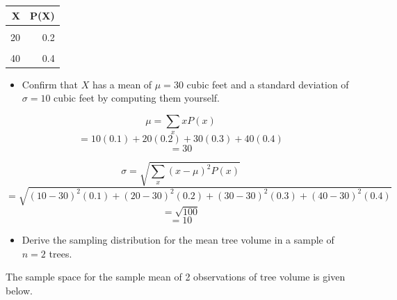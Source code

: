 \documentclass[
]{article}
\providecommand{\tightlist}{%
  \setlength{\itemsep}{0pt}\setlength{\parskip}{0pt}}
\begin{document}
\begin{table}[H]
\centering\centering
\begin{tabular}{rr}
\toprule
X & P(X)\\
\midrule
\cellcolor{gray!10}{10} & \cellcolor{gray!10}{0.1}\\
20 & 0.2\\
\cellcolor{gray!10}{30} & \cellcolor{gray!10}{0.3}\\
40 & 0.4\\
\bottomrule
\end{tabular}
\end{table}

\begin{itemize}
\tightlist
\item
  Confirm that \(X\) has a mean of \(\mu = 30\) cubic feet and a
  standard deviation of \(\sigma = 10\) cubic feet by computing them
  yourself.
\end{itemize}

{\[\mu = \sum_x xP(x)\] \[ = 10(0.1)+20(0.2)+30(0.3)+40(0.4)\]
\[ = 30\]}

{\[\sigma = \sqrt{\sum_x (x-\mu)^2P(x)}\]
\[ = \sqrt{(10-30)^2(0.1)+(20-30)^2(0.2)+(30-30)^2(0.3)+(40-30)^2(0.4)}\]
\[ = \sqrt{100}\] \[ = 10\]}

\begin{itemize}
\tightlist
\item
  Derive the sampling distribution for the mean tree volume in a sample
  of \(n = 2\) trees.
\end{itemize}

{The sample space for the sample mean of 2 observations of tree volume
is given below.}
\end{document}
